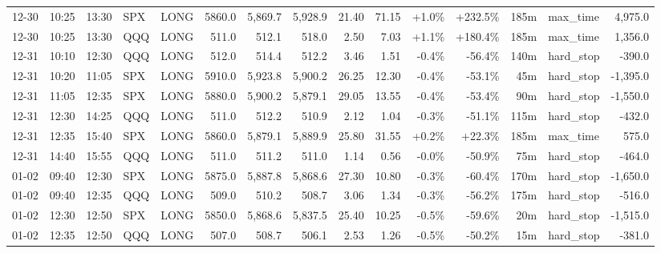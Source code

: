 \documentclass[11pt,a4paper,twoside]{article}
\begin{document}
\begin{landscape}
\begin{center}
\begin{longtable}{>{\color{txtmain}}l l l l l r r r r r r r r >{\color{txtmain}}l r}
12-30 & 10:25 & 13:30 & SPX & LONG & 5860.0 & 5,869.7 & 5,928.9 & 21.40 & 71.15 & \textcolor{wingreen}{+1.0\%} & \textcolor{wingreen}{+232.5\%} & 185m & max\_time & \textcolor{wingreen}{4,975.0} \\
12-30 & 10:25 & 13:30 & QQQ & LONG & 511.0 & 512.1 & 518.0 & 2.50 & 7.03 & \textcolor{wingreen}{+1.1\%} & \textcolor{wingreen}{+180.4\%} & 185m & max\_time & \textcolor{wingreen}{1,356.0} \\
12-31 & 10:10 & 12:30 & QQQ & LONG & 512.0 & 514.4 & 512.2 & 3.46 & 1.51 & \textcolor{lossred}{-0.4\%} & \textcolor{lossred}{-56.4\%} & 140m & hard\_stop & \textcolor{lossred}{-390.0} \\
12-31 & 10:20 & 11:05 & SPX & LONG & 5910.0 & 5,923.8 & 5,900.2 & 26.25 & 12.30 & \textcolor{lossred}{-0.4\%} & \textcolor{lossred}{-53.1\%} & 45m & hard\_stop & \textcolor{lossred}{-1,395.0} \\
12-31 & 11:05 & 12:35 & SPX & LONG & 5880.0 & 5,900.2 & 5,879.1 & 29.05 & 13.55 & \textcolor{lossred}{-0.4\%} & \textcolor{lossred}{-53.4\%} & 90m & hard\_stop & \textcolor{lossred}{-1,550.0} \\
12-31 & 12:30 & 14:25 & QQQ & LONG & 511.0 & 512.2 & 510.9 & 2.12 & 1.04 & \textcolor{lossred}{-0.3\%} & \textcolor{lossred}{-51.1\%} & 115m & hard\_stop & \textcolor{lossred}{-432.0} \\
12-31 & 12:35 & 15:40 & SPX & LONG & 5860.0 & 5,879.1 & 5,889.9 & 25.80 & 31.55 & \textcolor{wingreen}{+0.2\%} & \textcolor{wingreen}{+22.3\%} & 185m & max\_time & \textcolor{wingreen}{575.0} \\
12-31 & 14:40 & 15:55 & QQQ & LONG & 511.0 & 511.2 & 511.0 & 1.14 & 0.56 & \textcolor{lossred}{-0.0\%} & \textcolor{lossred}{-50.9\%} & 75m & hard\_stop & \textcolor{lossred}{-464.0} \\
01-02 & 09:40 & 12:30 & SPX & LONG & 5875.0 & 5,887.8 & 5,868.6 & 27.30 & 10.80 & \textcolor{lossred}{-0.3\%} & \textcolor{lossred}{-60.4\%} & 170m & hard\_stop & \textcolor{lossred}{-1,650.0} \\
01-02 & 09:40 & 12:35 & QQQ & LONG & 509.0 & 510.2 & 508.7 & 3.06 & 1.34 & \textcolor{lossred}{-0.3\%} & \textcolor{lossred}{-56.2\%} & 175m & hard\_stop & \textcolor{lossred}{-516.0} \\
01-02 & 12:30 & 12:50 & SPX & LONG & 5850.0 & 5,868.6 & 5,837.5 & 25.40 & 10.25 & \textcolor{lossred}{-0.5\%} & \textcolor{lossred}{-59.6\%} & 20m & hard\_stop & \textcolor{lossred}{-1,515.0} \\
01-02 & 12:35 & 12:50 & QQQ & LONG & 507.0 & 508.7 & 506.1 & 2.53 & 1.26 & \textcolor{lossred}{-0.5\%} & \textcolor{lossred}{-50.2\%} & 15m & hard\_stop & \textcolor{lossred}{-381.0} \\

\end{longtable}
\end{center}
\end{landscape}
\end{document}
